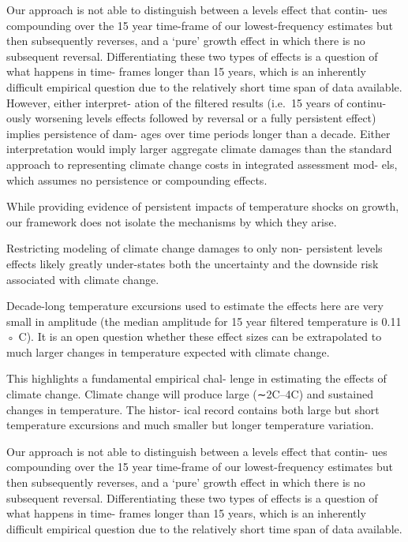 \documentclass[
]{book}
\begin{document}
Our approach is not able
to distinguish between a levels effect that contin-
ues compounding over the 15 year time-frame of
our lowest-frequency estimates but then subsequently
reverses, and a `pure' growth effect in which there
is no subsequent reversal. Differentiating these two
types of effects is a question of what happens in time-
frames longer than 15 years, which is an inherently
difficult empirical question due to the relatively short
time span of data available. However, either interpret-
ation of the filtered results (i.e.~15 years of continu-
ously worsening levels effects followed by reversal or
a fully persistent effect) implies persistence of dam-
ages over time periods longer than a decade. Either
interpretation would imply larger aggregate climate
damages than the standard approach to representing
climate change costs in integrated assessment mod-
els, which assumes no persistence or compounding
effects.

While providing evidence of persistent impacts of
temperature shocks on growth, our framework does
not isolate the mechanisms by which they arise.

Restricting
modeling of climate change damages to only non-
persistent levels effects likely greatly under-states both
the uncertainty and the downside risk associated with
climate change.

Decade-long temperature excursions used to estimate the effects here are
very small in amplitude (the median amplitude for
15 year filtered temperature is 0.11 ◦ C).
It is an open question
whether these effect sizes can be extrapolated to much
larger changes in temperature expected with climate
change.

This highlights a fundamental empirical chal-
lenge in estimating the effects of climate change.
Climate change will produce large (∼2C--4C)
and sustained changes in temperature. The histor-
ical record contains both large but short temperature
excursions and much smaller but longer temperature
variation.

Our approach is not able
to distinguish between a levels effect that contin-
ues compounding over the 15 year time-frame of
our lowest-frequency estimates but then subsequently
reverses, and a `pure' growth effect in which there
is no subsequent reversal. Differentiating these two
types of effects is a question of what happens in time-
frames longer than 15 years, which is an inherently
difficult empirical question due to the relatively short
time span of data available.
\end{document}
